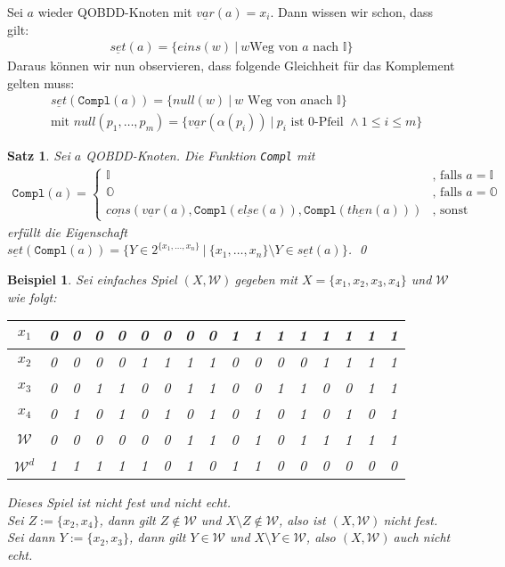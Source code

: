 \documentclass[ngerman]{scrartcl}
\theoremstyle{custom}
\newtheorem{mex}[mdef]{Beispiel}
\newtheorem{ms}[mdef]{Satz}
\newcommand{\0}{\mathbf{0}}
\newcommand{\1}{\mathbf{L}}
\newcommand{\then}{\underline{then}}
\newcommand{\el}{\underline{else}}
\newcommand{\var}{\underline{var}}
\newcommand{\set}{\underline{set}}
\newcommand{\cons}{\underline{cons}}
\newcommand{\sg}{$(X,\mathcal{W})~$}
\newcommand{\W}{\mathcal{W}}
\begin{document}
Sei $a$ wieder QOBDD-Knoten mit $\var(a) = x_i$. Dann wissen wir
schon, dass gilt:
\begin{align*}
\set(a) = \{eins(w) ~|~ w \text{Weg von } a \text{ nach } \mathds{I}\}
\end{align*}
Daraus k\"onnen wir nun observieren, dass folgende Gleichheit f\"ur
das Komplement gelten muss:
\begin{align*}
&\set(\texttt{Compl}(a)) =\{null(w) ~|~ w \text{ Weg von } a \text{
  nach } \mathds{I}\}\\
&\text{mit } null(p_1,\dots,p_m) =
\{\var(\alpha(p_i)) ~|~ p_i \text{ ist 0-Pfeil } \wedge 1 \leq i \leq m\}
\end{align*}

\begin{ms}
Sei $a$ QOBDD-Knoten. Die Funktion \texttt{Compl} mit
\begin{align*}
\texttt{Compl}(a) = \begin{cases} \mathds{I} &\text{, falls }
  a=\mathds{I}\\
\mathds{O} &\text{, falls } a = \mathds{O}\\
\cons(\var(a),\texttt{Compl}(\el(a)), \texttt{Compl}(\then(a)))
&\text{, sonst}
\end{cases}
\end{align*}
erf\"ullt die Eigenschaft $\set(\texttt{Compl}(a)) = \{ Y \in
2^{\{x_1,\dots,x_n\}} ~|~ \{x_1,\dots,x_n\} \setminus Y \in \set(a)\}$.
\qed
\end{ms}

\begin{mex}
Sei einfaches Spiel \sg gegeben mit $X = \{x_1,x_2,x_3,x_4\}$ und $\W$
wie folgt:
\begin{table}[h]
\begin{tabular}[h]{|c||c|c|c|c|c|c|c|c|c|c|c|c|c|c|c|c|}
\hline $x_1$ &   0&0&0&0&0&0&0&0&1&1&1&1&1&1&1&1 \\
\hline $x_2$ &   0&0&0&0&1&1&1&1&0&0&0&0&1&1&1&1 \\
\hline $x_3$ &   0&0&1&1&0&0&1&1&0&0&1&1&0&0&1&1 \\
\hline $x_4$ &   0&1&0&1&0&1&0&1&0&1&0&1&0&1&0&1 \\
\hline \hline $\W$ &    0&0&0&0&0&0&1&1&0&1&0&1&1&1&1&1 \\
\hline $\W^d$ &1&1&1&1&1&0&1&0&1&1&0&0&0&0&0&0 \\
\hline
\end{tabular}
\end{table}
\newline
Dieses Spiel ist nicht fest und nicht echt.\\
Sei $Z := \{x_2,x_4\}$, dann gilt $Z \not \in \W$ und $X \setminus Z
\not \in \W$, also ist \sg nicht fest.\\
Sei dann $Y := \{x_2,x_3\}$, dann gilt $Y \in \W$ und $X \setminus Y
\in \W$, also \sg auch nicht echt.
\end{mex} 
\end{document}
